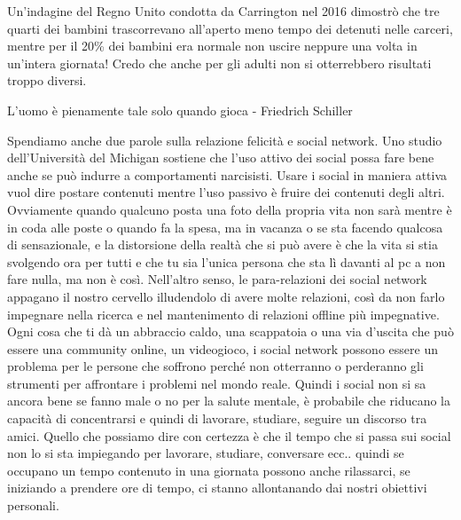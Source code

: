 \documentclass[12pt]{book} %
\begin{document}
\begin{mdframed}[linewidth=1pt]
\bigskip

Un'indagine del Regno Unito condotta da Carrington nel 2016 dimostrò che tre quarti dei bambini
trascorrevano all'aperto meno tempo dei detenuti nelle carceri, mentre per il 20\% dei bambini era
normale non uscire neppure una volta in un'intera giornata! Credo che anche per gli adulti non si
otterrebbero risultati troppo diversi.


\bigskip

L'uomo è pienamente tale solo quando gioca - Friedrich Schiller 


\bigskip

Spendiamo anche due parole sulla relazione felicità e social network. Uno studio dell'Università del Michigan sostiene
che l'uso attivo dei social possa fare bene anche se può indurre a comportamenti narcisisti. Usare
i social in maniera attiva vuol dire postare contenuti mentre l'uso passivo è fruire dei contenuti
degli altri. Ovviamente quando qualcuno posta una foto della propria vita non sarà mentre è in coda alle poste o quando
fa la spesa, ma in vacanza o se sta facendo qualcosa di sensazionale, e la distorsione della realtà che si può avere è
che la vita si stia svolgendo ora per tutti e che tu sia l'unica persona che sta lì davanti al pc
a non fare nulla, ma non è così. Nell'altro senso, le para-relazioni dei social network appagano il nostro cervello illudendolo di avere molte relazioni, così da non farlo impegnare nella ricerca e nel mantenimento di relazioni offline più impegnative.
Ogni cosa che ti dà un abbraccio caldo, una scappatoia o una via d'uscita che può essere una community online, un videogioco, i social network possono essere un problema per le persone che soffrono perché non otterranno o perderanno gli strumenti per affrontare i problemi nel mondo reale.
Quindi i social non si sa ancora bene se fanno male o no per la salute mentale, è probabile che riducano la capacità di concentrarsi e quindi di lavorare, studiare, seguire un discorso tra amici. Quello che possiamo dire con certezza è che il tempo che si passa sui social non lo si sta impiegando per lavorare, studiare, conversare ecc.. quindi se occupano un tempo contenuto in una giornata possono anche rilassarci, se iniziando a prendere ore di tempo, ci stanno allontanando dai nostri obiettivi personali.


\end{mdframed}
\end{document}
